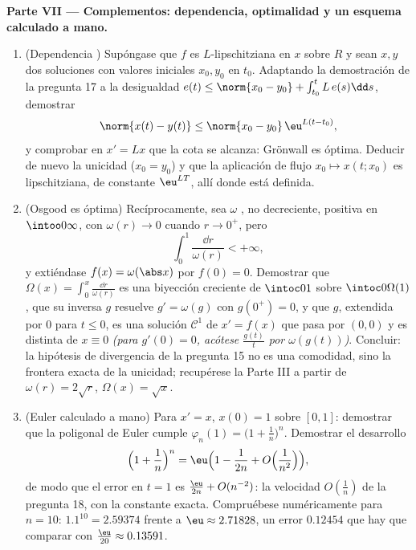 \begin{problem}[{Problema de fin de semana --- existencia de soluciones
de
$x' = f(t, x)$ sin hipótesis de Lipschitz}]
\medskip
\noindent\textbf{Parte VII --- Complementos: dependencia, optimalidad y
un esquema calculado a mano.}
\begin{enumerate}[resume]
  \item (Dependencia )
  Supóngase que $f$ es $L$-lipschitziana en $x$ sobre $R$ y sean $x, y$
  dos soluciones con valores iniciales $x_0, y_0$ en $t_0$. Adaptando la
  demostración de la pregunta 17 a la desigualdad $e(t) \leq \norm{x_0
        - y_0} + \int_{t_0}^tL\,e(s)\dd s$, demostrar
        \[
        \norm{x(t) - y(t)} \leq \norm{x_0 - y_0}\,
        \eu^{L(t - t_0)},
        \]
        y comprobar en $x' = Lx$ que la cota se alcanza: Grönwall es
        óptima. Deducir de nuevo la unicidad ($x_0 =
        y_0$) y que la aplicación de flujo $x_0 \mapsto x(t; x_0)$ es
        lipschitziana, de constante $\eu^{LT}$, allí donde está
        definida. \item (Osgood es óptima) Recíprocamente, sea $\omega$
        , no decreciente,
        positiva en $\intoo0\infty$, con $\omega(r) \to 0$ cuando
        $r \to 0^+$, pero
        \[
        \int_0^1\frac{\dd r}{\omega(r)} < +\infty,
        \]
        y extiéndase $f(x) = \omega(\abs x)$ por $f(0) = 0$. Demostrar
        que $\Omega(x) = \int_0^x\frac{\dd r}{\omega(r)}$ es una
        biyección creciente de $\intoc0{1}$ sobre $\intoc0{\Omega(1)}$,
        que su inversa $g$ resuelve $g'
        = \omega(g)$ con $g(0^+) = 0$, y que $g$, extendida por $0$ para
        $t \leq 0$, es una solución $\mathcal C^1$ de $x' = f(x)$ que
        pasa por $(0, 0)$ y es distinta de $x \equiv
        0$ \emph{(para $g'(0) = 0$, acótese $\frac{g(t)}t$ por
        $\omega(g(t))$)}. Concluir: la hipótesis de divergencia de la
        pregunta 15 no es una comodidad, sino la frontera exacta de la
        unicidad; recupérese la Parte III a partir de
        $\omega(r) = 2\sqrt r$, $\Omega(x) = \sqrt x$.
  \item (Euler calculado a mano) Para $x' = x$, $x(0) = 1$ sobre
  $[0, 1]$: demostrar que la poligonal de Euler cumple
  $\varphi_n(1) = \bigl(1 + \frac1n\bigr)^n$. Demostrar el desarrollo
        \[
        \Bigl(1 + \frac1n\Bigr)^{n}
        = \eu\Bigl(1 - \frac1{2n} + O\Bigl(\frac1{n^2}\Bigr)
        \Bigr),
        \]
        de modo que el error en $t = 1$ es $\frac{\eu}{2n} +
        O(n^{-2})$: la velocidad $O(\frac1n)$ de la pregunta 18, con la
        constante exacta. Compruébese numéricamente para $n = 10$:
        $1.1^{10} = 2.59374$ frente a $\eu \approx 2.71828$, un error
        $0.12454$ que hay que comparar con $\frac{\eu}{20}
        \approx 0.13591$.
\end{enumerate}
\end{problem}
